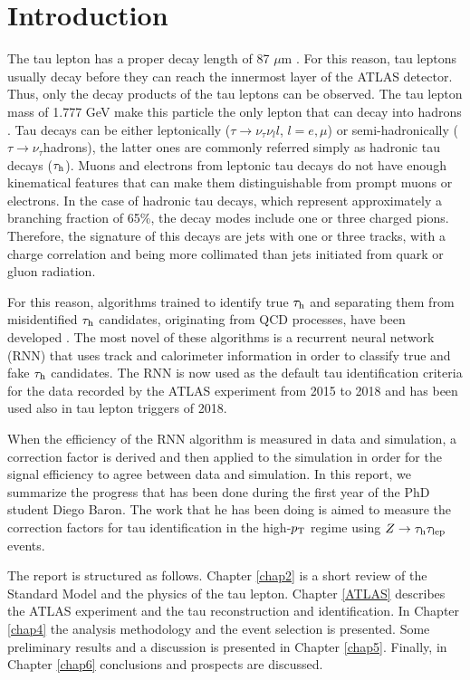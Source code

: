 \chapter{Introduction}\label{chap:introduction}
The tau lepton has a proper decay length of 87 $\mu$m \cite{PhysRevD.98.030001}. For this reason, tau leptons usually decay before they can reach the innermost layer of the ATLAS detector. Thus, only the decay products of the tau leptons can be observed. The tau lepton mass of 1.777 GeV make this particle the only lepton that can decay into hadrons \cite{PhysRevD.98.030001}. Tau decays can be either leptonically ($\tau\to\nu_\tau\nu_l l$, $l=e,\mu$) or semi-hadronically ($\tau\to\nu_\tau$hadrons), the latter ones are commonly referred simply as hadronic tau decays ($\tau_\text{h}$). Muons and electrons from leptonic tau decays do not have enough kinematical features that can make them distinguishable from prompt muons or electrons. In the case of hadronic tau decays, which represent approximately a branching fraction of 65\%, the decay modes include one or three charged pions. Therefore, the signature of this decays are jets with one or three tracks, with a charge correlation and being more collimated than jets initiated from quark or gluon radiation.

For this reason, algorithms trained to identify true $\tau_\text{h}$ and separating them from misidentified $\tau_\text{h}$  candidates, originating from QCD processes, have been developed \cite{Deutsch:2680523}. The most novel of these algorithms is a recurrent neural network (RNN) that uses track and calorimeter information in order to classify true and fake $\tau_\text{h}$ candidates. The RNN is now used as the default tau identification criteria for the data recorded by the ATLAS experiment from 2015 to 2018 and has been used also in tau lepton triggers of 2018.

When the efficiency of the RNN algorithm is measured in data and simulation, a correction factor is derived and then applied to the simulation in order for the signal efficiency to agree between data and simulation. In this report, we summarize the progress that has been done during the first year of the PhD student Diego Baron. The work that he has been doing is aimed to measure the correction factors for tau identification in the high-$p_\text{T}$ regime using $Z\to\tau_\text{h}\tau_\text{lep}$ events.

The report is structured as follows. Chapter \ref{chap2} is a short review of the Standard Model and the physics of the tau lepton. Chapter \ref{ATLAS} describes the ATLAS experiment and the tau reconstruction and identification. In Chapter \ref{chap4} the analysis methodology and the event selection is presented. Some preliminary results and a discussion is presented in Chapter \ref{chap5}. Finally, in Chapter \ref{chap6} conclusions and prospects are discussed.
